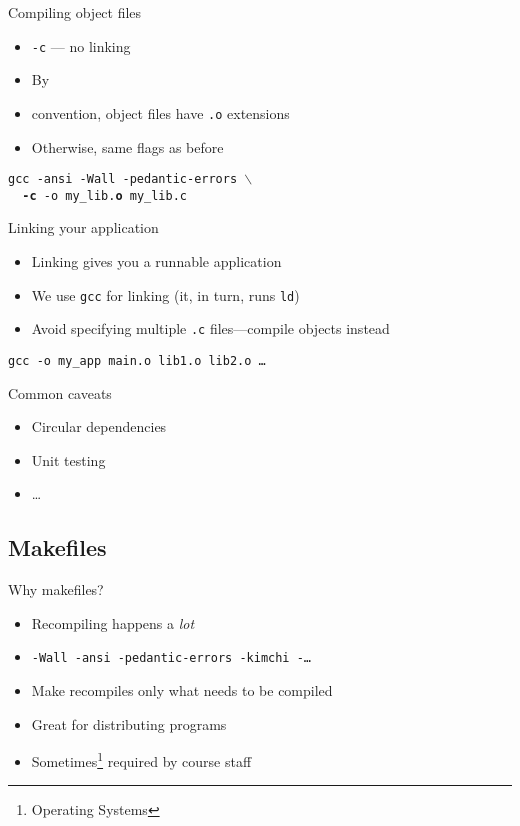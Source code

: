 \documentclass{beamer}
\begin{document}
\begin{frame}{Compiling object files}
  \begin{itemize}
    \item \texttt{-c} --- no linking
    \item By \item{convention}, object files have \texttt{.o} extensions
    \item Otherwise, same flags as before
  \end{itemize}

  \texttt{gcc -ansi -Wall -pedantic-errors $\backslash$ \\
  ~~\textbf{-c} -o my\_lib.\textbf{o} my\_lib.c}
\end{frame}

\begin{frame}{Linking your application}
  \begin{itemize}
    \item Linking gives you a runnable application
    \item We use \texttt{gcc} for linking (it, in turn, runs \texttt{ld})
    \item Avoid specifying multiple \texttt{.c} files---compile objects instead
  \end{itemize}

  \texttt{gcc -o my\_app main.o lib1.o lib2.o \ldots}
\end{frame}

\begin{frame}{Common caveats}
  \begin{itemize}
    \item Circular dependencies
    \item Unit testing
    \item \ldots
  \end{itemize}
\end{frame}

\subsection{Makefiles}

\begin{frame}{Why makefiles?}
  \begin{itemize}
    \item Recompiling happens a \emph{lot}
    \item \texttt{-Wall -ansi -pedantic-errors -kimchi -\ldots}
    \item Make recompiles only what needs to be compiled
    \item Great for distributing programs
      \pause
    \item Sometimes\footnote{Operating Systems} required by course staff
  \end{itemize}
\end{frame}
\end{document}
